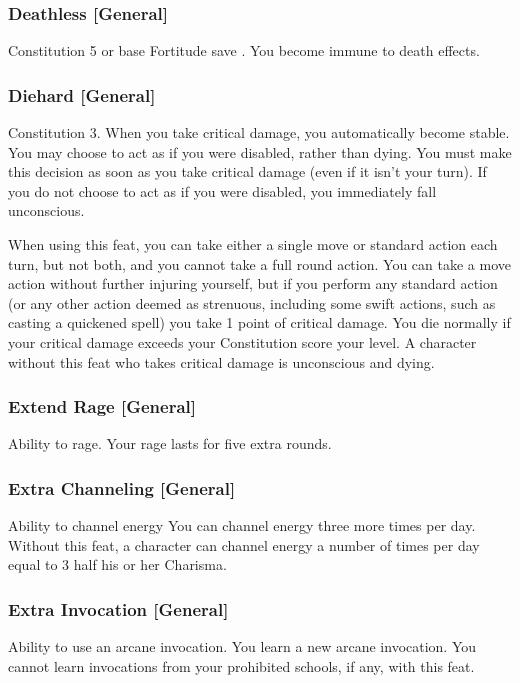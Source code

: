 \subsubsection{Deathless [General]}
\featpre Constitution 5 or base Fortitude save .
\featben You become immune to death effects.

\subsubsection{Diehard [General]}
 Constitution 3.
 When you take critical damage, you automatically become stable. You may choose to act as if you were disabled, rather than dying. You must make this decision as soon as you take critical damage (even if it isn't your turn). If you do not choose to act as if you were disabled, you immediately fall unconscious.
\par When using this feat, you can take either a single move or standard action each turn, but not both, and you cannot take a full round action. You can take a move action without further injuring yourself, but if you perform any standard action (or any other action deemed as strenuous, including some swift actions, such as casting a quickened spell) you take 1 point of critical damage. You die normally if your critical damage exceeds your Constitution score \add your level.
 A character without this feat who takes critical damage is unconscious and dying.

\subsubsection{Extend Rage [General]}
 Ability to rage.
 Your rage lasts for five extra rounds.

\subsubsection{Extra Channeling [General]}
 Ability to channel energy
 You can channel energy three more times per day. 
 Without this feat, a character can channel energy a number of times per day equal to 3 \add half his or her Charisma.

\subsubsection{Extra Invocation [General]}
 Ability to use an arcane invocation.
 You learn a new arcane invocation. You cannot learn invocations from your prohibited schools, if any, with this feat.

